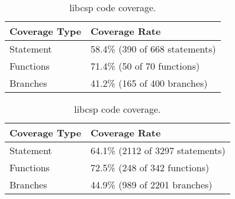 
\begin{table}[h]

\footnotesize
\parbox{.45\linewidth}{
\centering
\begin{tabular}{|l|l|}
\hline
\textbf{Coverage Type} & \textbf{Coverage Rate} \\
\hline
Statement     & 58.4\% (390 of 668 statements)\\
Functions     & 71.4\% (50 of 70 functions)\\
Branches      & 41.2\% (165 of 400 branches)\\
\hline
\end{tabular}
\caption{libgscsp code coverage.}
\label{table:libgscsp_coverage}
}
\hfill
\parbox{.45\linewidth}{
\centering
\begin{tabular}{|l|l|}
\hline
\textbf{Coverage Type} & \textbf{Coverage Rate} \\
\hline
Statement     & 64.1\% (2112 of 3297 statements)\\
Functions     & 72.5\% (248 of 342 functions)\\
Branches      & 44.9\% (989 of 2201 branches)\\
\hline
\end{tabular}
\caption{libcsp code coverage.}
\label{table:libcsp_coverage}
}
\end{table}